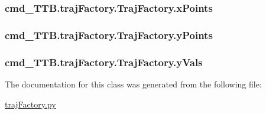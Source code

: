 \subsubsection[{\texorpdfstring{x\+Points}{xPoints}}]{\setlength{\rightskip}{0pt plus 5cm}cmd\+\_\+\+T\+T\+B.\+traj\+Factory.\+Traj\+Factory.\+x\+Points}\hypertarget{classcmd__TTB_1_1trajFactory_1_1TrajFactory_a6dd492eb38a8d0551974c7c03ccda61e}{}\label{classcmd__TTB_1_1trajFactory_1_1TrajFactory_a6dd492eb38a8d0551974c7c03ccda61e}
\subsubsection[{\texorpdfstring{y\+Points}{yPoints}}]{\setlength{\rightskip}{0pt plus 5cm}cmd\+\_\+\+T\+T\+B.\+traj\+Factory.\+Traj\+Factory.\+y\+Points}\hypertarget{classcmd__TTB_1_1trajFactory_1_1TrajFactory_ad94e5ab21d61d2abdb570c2ac00cfd34}{}\label{classcmd__TTB_1_1trajFactory_1_1TrajFactory_ad94e5ab21d61d2abdb570c2ac00cfd34}
\subsubsection[{\texorpdfstring{y\+Vals}{yVals}}]{\setlength{\rightskip}{0pt plus 5cm}cmd\+\_\+\+T\+T\+B.\+traj\+Factory.\+Traj\+Factory.\+y\+Vals}\hypertarget{classcmd__TTB_1_1trajFactory_1_1TrajFactory_a37b4adbe457a79a1cffd38b5022fbc3b}{}\label{classcmd__TTB_1_1trajFactory_1_1TrajFactory_a37b4adbe457a79a1cffd38b5022fbc3b}


The documentation for this class was generated from the following file\+:\begin{DoxyCompactItemize}
\item 
\hyperlink{trajFactory_8py}{traj\+Factory.\+py}\end{DoxyCompactItemize}
